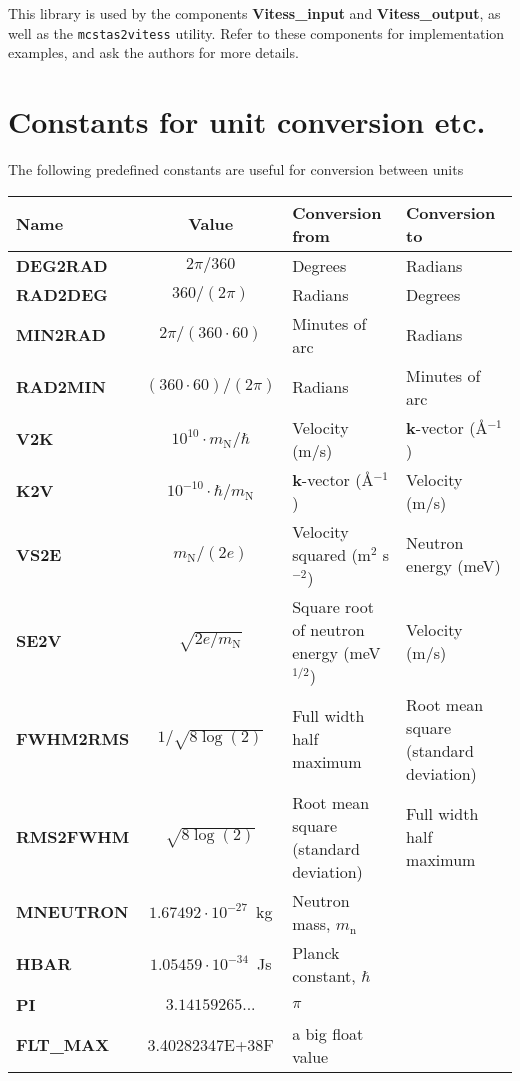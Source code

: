 This library is used by the components
\textbf{Vitess\_input} and \textbf{Vitess\_output},
as well as the \verb+mcstas2vitess+ utility.
Refer to these components for implementation examples, and ask the authors for more details.

\section{Constants for unit conversion etc.}

The following predefined constants are useful for conversion
between units
\def\textvb#1{\textbf{#1}\index{#1 (constant)@\texttt{#1} (constant)|textbf}}
\begin{center}
\begin{tabular}{|l|c|p{}|p{}|}
\hline
Name & Value & Conversion from & Conversion to \\ \hline
\textvb{DEG2RAD} & $2 \pi / 360$ & Degrees & Radians \\
\textvb{RAD2DEG} & $360 / (2 \pi)$ & Radians & Degrees \\
\textvb{MIN2RAD} & $2 \pi / (360 \cdot 60)$
  & Minutes of arc & Radians \\
\textvb{RAD2MIN} & $(360\cdot 60) / (2 \pi)$
  & Radians & Minutes of arc \\
\textvb{V2K} & $10^{10} \cdot m_\mathrm{N}/\hbar$
  & Velocity (m/s) & \textbf{k}-vector (\AA$^{-1}$) \\
\textvb{K2V} & $10^{-10} \cdot \hbar / m_\mathrm{N}$
  & \textbf{k}-vector (\AA$^{-1}$) & Velocity (m/s) \\
\textvb{VS2E} & $m_\mathrm{N} / (2 e)$
  & Velocity squared (m$^2$ s$^{-2}$) & Neutron energy (meV) \\
\textvb{SE2V} & $\sqrt{2 e/m_\mathrm{N}}$
  & Square root of neutron energy (meV$^{1/2}$) & Velocity (m/s) \\
\textvb{FWHM2RMS} & $1/\sqrt{8\log(2)}$
  & Full width half maximum & Root mean square (standard deviation) \\
\textvb{RMS2FWHM} & $\sqrt{8\log(2)}$
  & Root mean square (standard deviation) & Full width half maximum \\
\textvb{MNEUTRON} & $1.67492 \cdot 10^{-27}$~kg
  & Neutron mass, $m_\mathrm{n}$ & \\
\textvb{HBAR} & $1.05459 \cdot 10^{-34}$~Js
  & Planck constant, $\hbar$ & \\
\textvb{PI} & $3.14159265...$
  & $\pi$ & \\
\textvb{FLT\_MAX} & 3.40282347E+38F
  & a big float value & \\
\hline
\end{tabular}
\end{center}
